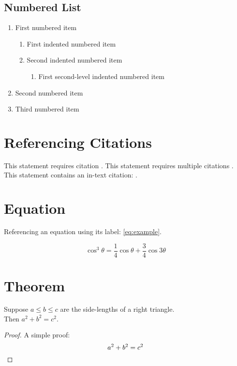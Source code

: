 \documentclass{mathcryptology} %
\begin{document}
\subsection{Numbered List}

\begin{enumerate}
	\item First numbered item
	\begin{enumerate}
		\item First indented numbered item
		\item Second indented numbered item
		\begin{enumerate}
			\item First second-level indented numbered item
		\end{enumerate}
	\end{enumerate}
	\item Second numbered item
	\item Third numbered item
\end{enumerate}


\section{Referencing Citations}

This statement requires citation \cite{Smith:2012qr}. This statement requires multiple citations \cite{Smith:2013jd, Smith:2012qr}. This statement contains an in-text citation: \textcite{Smith:2013jd}.


\section{Equation}

Referencing an equation using its label: \ref{eq:example}.

\begin{equation}
	\cos^3 \theta =\frac{1}{4}\cos\theta+\frac{3}{4}\cos 3\theta
	\label{eq:example}
\end{equation}


\section{Theorem}

\begin{theorem}[Pythagoras] 

Suppose $a\leq b\leq c$ are the side-lengths of a right triangle.\\  Then $a^2+b^2=c^2$.

\end{theorem}
\begin{proof}
A simple proof:
\[
a^2 + b^2 = c^2 \qedhere
\]
\end{proof}
\end{document}
